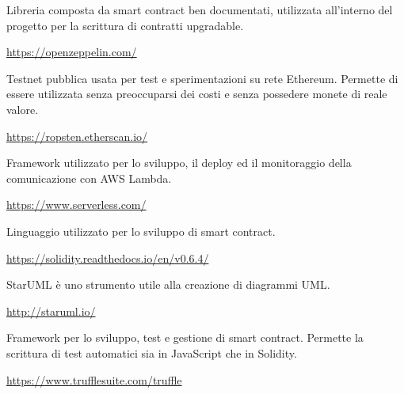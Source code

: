 	Libreria composta da smart contract ben documentati, utilizzata all'interno del progetto per la scrittura di contratti upgradable.
	\begin{center}
		\url{https://openzeppelin.com/}
	\end{center}

	Testnet pubblica usata per test e sperimentazioni su rete Ethereum. Permette di essere utilizzata senza preoccuparsi dei costi e senza possedere monete di reale valore.
	\begin{center}
		\url{https://ropsten.etherscan.io/}
	\end{center}

	Framework utilizzato per lo sviluppo, il deploy ed il monitoraggio della comunicazione con AWS Lambda.
	\begin{center}
		\url{https://www.serverless.com/}
	\end{center}

	Linguaggio utilizzato per lo sviluppo di smart contract.
	\begin{center}
		\url{https://solidity.readthedocs.io/en/v0.6.4/}
	\end{center}

	StarUML è uno strumento utile alla creazione di diagrammi UML.
	\begin{center}
		\url{http://staruml.io/}
	\end{center}

	Framework per lo sviluppo, test e gestione di smart contract. Permette la scrittura di test automatici sia in JavaScript che in Solidity.
	\begin{center}
		\url{https://www.trufflesuite.com/truffle}
	\end{center}

